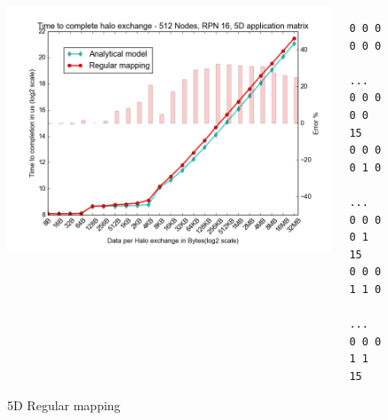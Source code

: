\documentclass{beamer}
\begin{document}
\begin{frame}[fragile]
\begin{figure}
\caption{5D Regular mapping}
\begin{columns}
  \begin{column}{0.6\textwidth}
    \includegraphics[width=1\textwidth]{../mappings/5d_regular_model.png}
  \end{column}
  \begin{column}{0.3\textwidth}
\lstset{title=Mapping sample}
\begin{lstlisting}[basicstyle=\footnotesize\ttfamily, frame=lines,columns=fixed]
0 0 0 0 0 0
    ...
0 0 0 0 0 15
0 0 0 0 1 0
    ...
0 0 0 0 1 15
0 0 0 1 1 0
    ...
0 0 0 1 1 15
\end{lstlisting}
  \end{column}
\end{columns}
\end{figure}
\end{frame}
\end{document}

